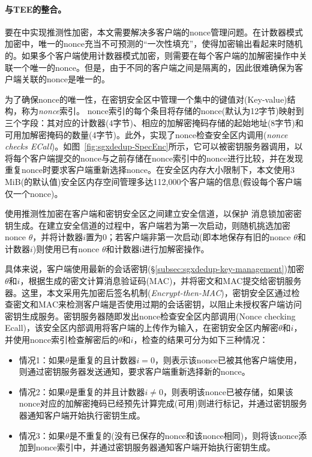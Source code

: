 \paragraph*{与TEE的整合。}要在\sysnameS 中实现推测性加密，本文需要解决多客户端的nonce管理问题。在计数器模式加密中，唯一的nonce充当不可预测的“一次性填充”，使得加密输出看起来时随机的\cite{counter}。如果多个客户端使用计数器模式加密，则需要在每个客户端的加解密操作中关联一个唯一的nonce。但是，由于不同的客户端之间是隔离的，因此很难确保为客户端关联的nonce是唯一的。

为了确保nonce的唯一性，\sysnameS 在密钥安全区中管理一个集中的键值对(Key-value)结构，称为\textit{nonce}索引。 nonce索引的每个条目将存储的nonce(默认为12字节)映射到三个字段：其对应的计数器(4字节)、相应的加解密掩码存储的起始地址(8字节)和可用加解密掩码的数量(4字节)。此外，\sysnameS 实现了nonce检查安全区内调用(\textit{nonce checks ECall})。如图~\ref{fig:sgxdedup-SpecEnc}所示，它可以被密钥服务器调用，以将每个客户端提交的nonce与之前存储在nonce索引中的nonce进行比较，并在发现重复nonce时要求客户端重新选择nonce。在安全区内存大小限制下，本文使用3\,MiB(\sysnameS 的默认值)安全区内存空间管理多达112,000个客户端的信息(假设每个客户端仅一个nonce)。

\sysnameS 使用推测性加密在客户端和密钥安全区之间建立安全信道，以保护 消息锁加密密钥生成。在建立安全信道的过程中，客户端若为第一次启动，则随机挑选加密nonce $\theta$，并将计数器$i$置为0；若客户端非第一次启动(即本地保存有旧的nonce $\theta$和计数器$i$)则使用已有nonce $\theta$和计数器i进行加解密操作。

具体来说，客户端使用最新的会话密钥(\S\ref{subsec:sgxdedup-key-management})加密$\theta$和$i$，根据生成的密文计算消息验证码(MAC)，并将密文和MAC提交给密钥服务器。这里，本文采用先加密后签名机制(\textit{Encrypt-then-MAC})\cite{bellare2000Authenticated}，密钥安全区通过检查密文和MAC来检测客户端是否使用过期的会话密钥，以阻止未授权客户端访问密钥生成服务。密钥服务器随即发出nonce检查安全区内部调用(Nonce checking Ecall)，该安全区内部调用将客户端的上传作为输入，在密钥安全区内解密$\theta$和$i$，并使用nonce索引检查解密后的$\theta$和$i$，检查的结果可分为如下三种情况：

\begin{itemize}[leftmargin=*]
    \item 情况1：如果$\theta$是重复的且计数器$i = 0$，则表示该nonce已被其他客户端使用，则通过密钥服务器发送通知，要求客户端重新选择新的nonce。
    \item 情况2：如果$\theta$是重复的并且计数器$i \neq 0$，则表明该nonce已被存储，如果该nonce对应的加解密掩码已经预先计算完成(可用)则进行标记，并通过密钥服务器通知客户端开始执行密钥生成。
    \item 情况3：如果$\theta$是不重复的(没有已保存的nonce和该nonce相同)，则将该nonce添加到nonce索引中，并通过密钥服务器通知客户端开始执行密钥生成。
\end{itemize}

